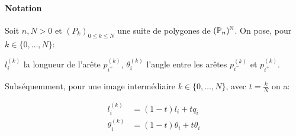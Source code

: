 \paragraph*{Notation} Soit $n,N>0$ et $(P_k)_{0\leq k\leq N}$ une suite de polygones de $(\mathbb{P}_{n})^{\mathbb{N}}$.
On pose, pour $k\in\{0,\ldots,N\}$:
\begin{itemize}
    \flch $l^{(k)}_i$ la longueur de l'arête $p^{(k)}_{i^{+}}$,
    \flch $\theta^{(k)}_i$ l'angle entre les arêtes $p^{(k)}_{i^{-}}$ et $p^{(k)}_{i^{+}}$.
\end{itemize}
Subséquemment, pour une image intermédiaire $k \in \{0,\ldots,N\}$, avec $t=\frac{k}{N}$ on a:

\begin{align*}
        l^{(k)}_i &= (1-t)l_i+tq_i\\
        \theta^{(k)}_i &= (1-t)\theta_i+t\theta_i
\end{align*}
